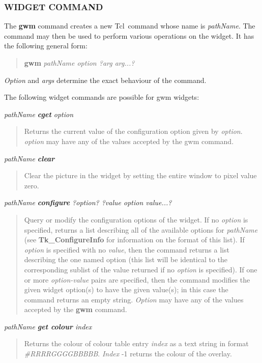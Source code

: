 \documentclass[twoside,11pt,nolof]{starlink}
\newenvironment{rquote}{\begin{quote}\raggedright}{\end{quote}}
\providecommand{\Tcl}{{\textsf{Tcl}}}
\begin{document}
\subsubsection{WIDGET COMMAND}

The {\bf{gwm}} command creates a new \Tcl\ command whose name is
{\em{pathName}}.  The command may then be used to perform various
operations on the widget. It has the following general form:

\begin{quote}
\textbf{gwm} \emph{pathName option ?arg arg...?}
\end{quote}

{\em{Option}} and {\em{args}} determine the exact behaviour of the command.

The following widget commands are possible for gwm widgets:

\emph{pathName \textbf{cget} option}
\begin{rquote}
Returns the current value of the configuration option given by \emph{option}.
\emph{option} may have any of the values accepted by the gwm command.
\end{rquote}

\emph{pathName \textbf{clear}}
\begin{rquote}
Clear the picture in the widget by setting the entire window to pixel
value zero.
\end{rquote}

\emph{pathName \textbf{configure} ?option? ?value option value...?}
\begin{rquote}
Query or modify the configuration options of the widget.
If no {\em{option}} is specified, returns a list describing all of
the available options for {\em{pathName}} (see {\bf{Tk\_ConfigureInfo}} for
information on the format of this list).  If \emph{option} is specified
with no \emph{value}, then the command returns a list describing the
one named option (this list will be identical to the corresponding
sublist of the value returned if no \emph{option} is specified).  If
one or more \emph{option-value} pairs are specified, then the command
modifies the given widget option(s) to have the given value(s);  in
this case the command returns an empty string.
\emph{Option} may have any of the values accepted by the \textbf{gwm}
command.
\end{rquote}

\emph{pathName \textbf{get colour} index}
\begin{rquote}
Returns the colour of colour table entry \emph{index} as a text string in
format \hbox{\emph{\#RRRRGGGGBBBBB}}. \emph{Index} -1 returns the
colour of the overlay.
\end{rquote}
\end{document}
